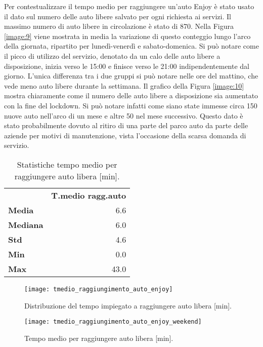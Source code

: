 Per contestualizzare il tempo medio per raggiungere un'auto Enjoy è stato usato il dato sul numero delle auto libere salvato per ogni richiesta ai servizi. Il massimo numero di auto libere in circolazione è stato di 870. Nella Figura \ref{image:9} viene mostrata in media la variazione di questo conteggio lungo l'arco della giornata, ripartito per lunedì-venerdì e sabato-domenica. Si può notare come il picco di utilizzo del servizio, denotato da un calo delle auto libere a disposizione, inizia verso le 15:00 e finisce verso le 21:00 indipendentemente dal giorno. L'unica differenza tra i due gruppi si può notare nelle ore del mattino, che vede meno auto libere durante la settimana. Il grafico della Figura \ref{image:10} mostra chiaramente come il numero delle auto libere a disposizione sia aumentato con la fine del lockdown. Si può notare infatti come siano state immesse circa 150 nuove auto nell'arco di un mese e altre 50 nel mese successivo. Questo dato è stato probabilmente dovuto al ritiro di una parte del parco auto da parte delle aziende per motivi di manutenzione, vista l'occasione della scarsa domanda di servizio.

\begin{table}[H]
	\centering
	\begin{tabular}{ | l r | }
		\hline
		& \textbf{T.medio ragg.auto} \\
		\textbf{Media}   &  6.6 \\
		\textbf{Mediana} &  6.0 \\
		\textbf{Std}     &  4.6 \\
		\textbf{Min}     &  0.0 \\ 
		\textbf{Max}     & 43.0 \\
		\hline
	\end{tabular}
	\caption{Statistiche tempo medio per raggiungere auto libera [min].}
	\label{table:4}
\end{table}

\begin{figure}[H]
	\centering
	\texttt{[image: tmedio\_raggiungimento\_auto\_enjoy]}
	\caption{Distribuzione del tempo impiegato a raggiungere auto libera [min].}
	\label{image:8}
\end{figure}

\begin{figure}
	\centering
	\texttt{[image: tmedio\_raggiungimento\_auto\_enjoy\_weekend]}
	\caption{Tempo medio per raggiungere auto libera [min].}
	\label{image:21}
\end{figure}

